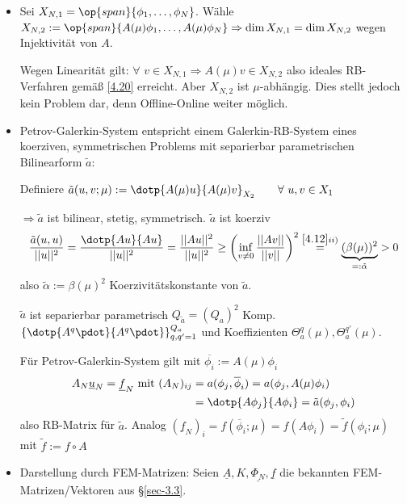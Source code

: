 \begin{bem} \beginwithlistbem
	\begin{itemize}
		\item Sei $X_{N,1} = \op{span}\{\phi_1,\dots,\phi_N\}$. Wähle $X_{N,2} := \op{span} \{A(\mu) \phi_1,\dots,A(\mu)\phi_N\} \Rightarrow \dim X_{N,1} = \dim X_{N,2}$ wegen Injektivität von $A$.
		
		Wegen Linearität gilt: $\forall \,\, v \in X_{N,1} \Rightarrow A(\mu)v \in X_{N,2}$ also ideales RB-Verfahren gemäß \ref{4.20} erreicht. Aber $X_{N,2}$ ist $\mu$-abhängig. Dies stellt jedoch kein Problem dar, denn Offline-Online weiter möglich.
		\item Petrov-Galerkin-System entspricht einem Galerkin-RB-System eines koerziven, symmetrischen Problems mit separierbar parametrischen Bilinearform $\tilde{a}$:
		
		Definiere $\tilde{a}(u,v;\mu) := \dotp{A(\mu)u}{A(\mu)v}_{X_2} \qquad \forall \,\, u,v \in X_1$
		
		$\Rightarrow \tilde{a}$ ist bilinear, stetig, symmetrisch. $\tilde{a}$ ist koerziv
		\begin{equation}
			\frac{\tilde{a}(u,u)}{||u||^2} = \frac{\dotp{Au}{Au}}{||u||^2} = \frac{||Au||^2}{||u||^2} \geq \left(\inf\limits_{v \neq 0} \frac{||Av||}{||v||} \right)^2 \overset{\ref{4.12} ii)}{=} \underbrace{(\beta(\mu))^2}_{=: \tilde\alpha} > 0 \label{eq:4.7}
		\end{equation}
		also $\tilde{\alpha} := \beta(\mu)^2$ Koerzivitätskonstante von $\tilde{a}$.
		
		$\tilde{a}$ ist separierbar parametrisch $Q_{\tilde{a}} = (Q_a)^2$ Komp.  $\{\dotp{A^q\pdot}{A^q\pdot}\}_{q,q' =1}^{Q_a}$ und Koeffizienten $\Theta_a^q(\mu), \Theta_a^{q'}(\mu)$.
		
		Für Petrov-Galerkin-System gilt mit $\overline{\phi_i} := A(\mu) \phi_i$
		\begin{align*}
		A_N \underline{u}_N = \underline{f}_N \text{ mit } (A_N)_{ij} &= a(\phi_j,\overline{\phi}_i) = a(\phi_j, A(\mu)\phi_i) \\
		&= \dotp{A\phi_j}{A\phi_i} = \tilde{a} (\phi_j,\phi_i)
		\end{align*}
		also RB-Matrix für $\tilde{a}$. Analog $(\underline{f}_N)_i = f(\overline{\phi}_i;\mu) = f(A\phi_i) = \tilde{f}(\phi_i;\mu)$ mit $\tilde{f} := f \circ A$
		\item Darstellung durch FEM-Matrizen: Seien $\underline{A}, K, \underline{\Phi_N}, \underline{f}$ die bekannten FEM-Matrizen/Vektoren aus §\ref{sec-3.3}.
		

\end{itemize}
\end{bem}
